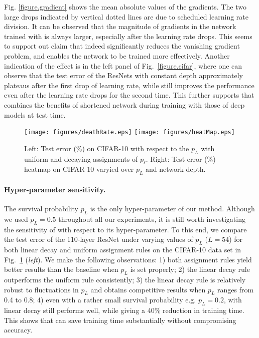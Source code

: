\documentclass[runningheads]{llncs}
\begin{document}
Fig. \ref{figure.gradient} shows the mean absolute values of the gradients. The two large drops indicated by vertical dotted lines are due to scheduled learning rate division. It can be observed that the magnitude of gradients in the network trained with \name{} is always larger, especially after the learning rate drops. This seems to support out claim that \name{} indeed significantly reduces the vanishing gradient problem, and enables the network to be trained more effectively.  Another indication of the effect is in the left panel of Fig.~\ref{figure.cifar}, where one can observe that the test error of the ResNets with constant depth approximately plateaus after the first drop of learning rate, while \name{} still improves the performance even after the learning rate drops for the second time. This further supports that \name{} combines the benefits of shortened network during training with those of deep models at test time.

\begin{figure}[t]
	\vspace{-2ex}
	\begin{center}
		\centerline{\texttt{[image: figures/deathRate.eps]}
		\texttt{[image: figures/heatMap.eps]}}
	\end{center}
	\vspace{-4ex}
    \label{figure.deathRate}
	\caption{Left: Test error (\%) on CIFAR-10 with respect to the  $p_L$ with uniform and decaying assignments of $p_\ell$. Right: Test error (\%) heatmap on CIFAR-10 varyied over $p_L$ and network depth.}
	\vspace{-4ex}
	\label{figure.deathRate}
\end{figure}

\paragraph{\textbf{Hyper-parameter sensitivity.}}
The survival probability $p_L$ is the only hyper-parameter of our method. Although we used $p_L\!=\!0.5$ throughout all our experiments, it is still worth investigating the sensitivity of \name{} with respect to its hyper-parameter. To this end, we compare the test error of the 110-layer ResNet under varying values of $p_L$ ($L=54$) for both linear decay and uniform assignment rules on the CIFAR-10 data set in Fig.~\ref{figure.deathRate} (\textit{left}). We make the following observations: 1) both assignment rules yield better results than the baseline when $p_L$ is set properly; 2) the linear decay rule outperforms the uniform rule consistently; 3) the linear decay rule is relatively robust to fluctuations in $p_L$ and obtains competitive results when $p_L$ ranges from 0.4 to 0.8; 4) even with a rather small survival probability e.g. $p_L=0.2$, \name{} with linear decay still performs well, while giving a 40\% reduction in training time. This shows that \name{} can save training time substantially without compromising accuracy.
\end{document}
